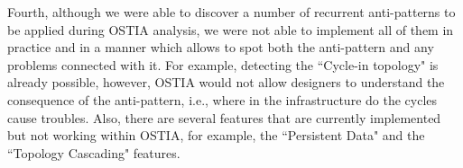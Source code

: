 Fourth, although we were able to discover a number of recurrent anti-patterns to be applied during OSTIA analysis, we were not able to implement all of them in practice and in a manner which allows to spot both the anti-pattern and any problems connected with it. For example, detecting the ``Cycle-in topology" is already possible, however, OSTIA would not allow designers to understand the consequence of the anti-pattern, i.e., where in the infrastructure do the cycles cause troubles. Also, there are several features that are currently implemented but not working within OSTIA, for example, the ``Persistent Data" and the ``Topology Cascading" features.
%

